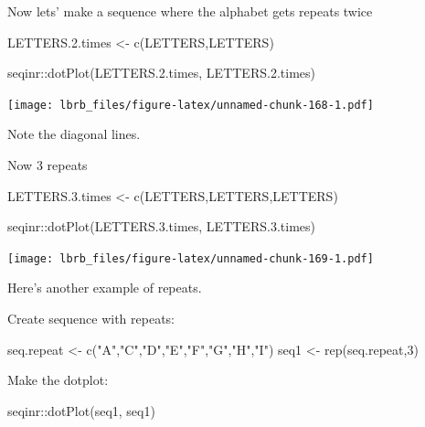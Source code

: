 \documentclass[
]{book}
\newenvironment{Shaded}{\begin{snugshade}}{\end{snugshade}}
\newcommand{\DecValTok}[1]{\textcolor[rgb]{0.00,0.00,0.81}{#1}}
\newcommand{\FloatTok}[1]{\textcolor[rgb]{0.00,0.00,0.81}{#1}}
\newcommand{\FunctionTok}[1]{\textcolor[rgb]{0.00,0.00,0.00}{#1}}
\newcommand{\NormalTok}[1]{#1}
\newcommand{\OtherTok}[1]{\textcolor[rgb]{0.56,0.35,0.01}{#1}}
\newcommand{\SpecialCharTok}[1]{\textcolor[rgb]{0.00,0.00,0.00}{#1}}
\newcommand{\StringTok}[1]{\textcolor[rgb]{0.31,0.60,0.02}{#1}}
\begin{document}
Now lets' make a sequence where the alphabet gets repeats twice

\begin{Shaded}
\begin{Highlighting}[]
\NormalTok{LETTERS.}\FloatTok{2.}\NormalTok{times }\OtherTok{\textless{}{-}} \FunctionTok{c}\NormalTok{(LETTERS,LETTERS)}

\NormalTok{seqinr}\SpecialCharTok{::}\FunctionTok{dotPlot}\NormalTok{(LETTERS.}\FloatTok{2.}\NormalTok{times, }
\NormalTok{                LETTERS.}\FloatTok{2.}\NormalTok{times)}
\end{Highlighting}
\end{Shaded}

\texttt{[image: lbrb\_files/figure-latex/unnamed-chunk-168-1.pdf]}

Note the diagonal lines.

Now 3 repeats

\begin{Shaded}
\begin{Highlighting}[]
\NormalTok{LETTERS.}\FloatTok{3.}\NormalTok{times }\OtherTok{\textless{}{-}} \FunctionTok{c}\NormalTok{(LETTERS,LETTERS,LETTERS)}

\NormalTok{seqinr}\SpecialCharTok{::}\FunctionTok{dotPlot}\NormalTok{(LETTERS.}\FloatTok{3.}\NormalTok{times, }
\NormalTok{                LETTERS.}\FloatTok{3.}\NormalTok{times)}
\end{Highlighting}
\end{Shaded}

\texttt{[image: lbrb\_files/figure-latex/unnamed-chunk-169-1.pdf]}

Here's another example of repeats.

Create sequence with repeats:

\begin{Shaded}
\begin{Highlighting}[]
\NormalTok{seq.repeat }\OtherTok{\textless{}{-}} \FunctionTok{c}\NormalTok{(}\StringTok{"A"}\NormalTok{,}\StringTok{"C"}\NormalTok{,}\StringTok{"D"}\NormalTok{,}\StringTok{"E"}\NormalTok{,}\StringTok{"F"}\NormalTok{,}\StringTok{"G"}\NormalTok{,}\StringTok{"H"}\NormalTok{,}\StringTok{"I"}\NormalTok{)}
\NormalTok{seq1 }\OtherTok{\textless{}{-}} \FunctionTok{rep}\NormalTok{(seq.repeat,}\DecValTok{3}\NormalTok{)}
\end{Highlighting}
\end{Shaded}

Make the dotplot:

\begin{Shaded}
\begin{Highlighting}[]
\NormalTok{seqinr}\SpecialCharTok{::}\FunctionTok{dotPlot}\NormalTok{(seq1, }
\NormalTok{                seq1)}
\end{Highlighting}
\end{Shaded}
\end{document}
